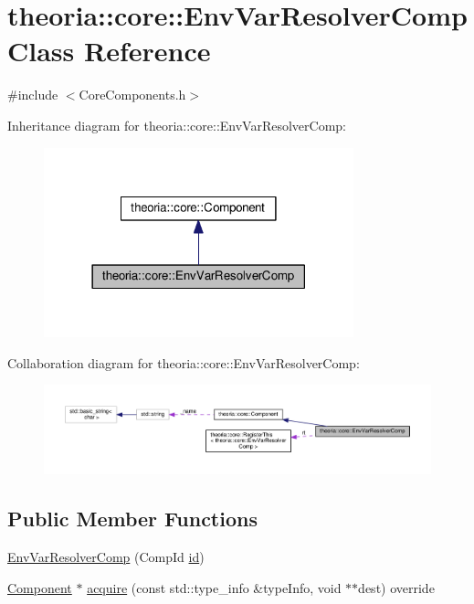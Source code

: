 \hypertarget{classtheoria_1_1core_1_1EnvVarResolverComp}{}\section{theoria\+:\+:core\+:\+:Env\+Var\+Resolver\+Comp Class Reference}
\label{classtheoria_1_1core_1_1EnvVarResolverComp}


{\ttfamily \#include $<$Core\+Components.\+h$>$}



Inheritance diagram for theoria\+:\+:core\+:\+:Env\+Var\+Resolver\+Comp\+:\nopagebreak
\begin{figure}[H]
\begin{center}
\leavevmode
\includegraphics[width=254pt]{classtheoria_1_1core_1_1EnvVarResolverComp__inherit__graph}
\end{center}
\end{figure}


Collaboration diagram for theoria\+:\+:core\+:\+:Env\+Var\+Resolver\+Comp\+:\nopagebreak
\begin{figure}[H]
\begin{center}
\leavevmode
\includegraphics[width=350pt]{classtheoria_1_1core_1_1EnvVarResolverComp__coll__graph}
\end{center}
\end{figure}
\subsection*{Public Member Functions}
\begin{DoxyCompactItemize}
\item 
\hyperlink{classtheoria_1_1core_1_1EnvVarResolverComp_a0d015c8dd5ad4e8f2b1e33af88f0791a}{Env\+Var\+Resolver\+Comp} (Comp\+Id \hyperlink{classtheoria_1_1core_1_1Component_ab539df9f996efceda7743fa1b69cd25d}{id})
\item 
\hyperlink{classtheoria_1_1core_1_1Component}{Component} $\ast$ \hyperlink{classtheoria_1_1core_1_1EnvVarResolverComp_aac22e843f14123d2627f8c8ca0311b80}{acquire} (const std\+::type\+\_\+info \&type\+Info, void $\ast$$\ast$dest) override
\end{DoxyCompactItemize}
